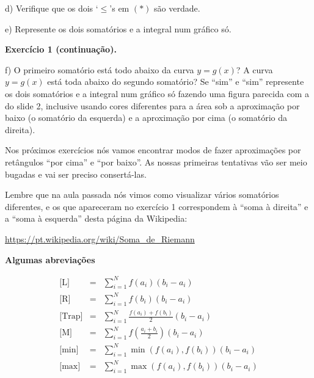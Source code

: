 \documentclass[oneside,12pt]{article}
\begin{document}
d) Verifique que os dois `$≤$'s em $(*)$ são verdade.

e) Represente os dois somatórios e a integral num gráfico só.


\newpage

{\bf Exercício 1 (continuação).}

\ssk

f) O primeiro somatório está todo abaixo da curva $y=g(x)$? A curva
$y=g(x)$ está toda abaixo do segundo somatório? Se ``sim'' e ``sim''
represente os dois somatórios e a integral num gráfico só fazendo uma
figura parecida com a do slide 2, inclusive usando cores diferentes
para a área sob a aproximação por baixo (o somatório da esquerda) e a
aproximação por cima (o somatório da direita).


\newpage

Nos próximos exercícios nós vamos encontrar modos de fazer
aproximações por retângulos ``por cima'' e ``por baixo''. As nossas
primeiras tentativas vão ser meio bugadas e vai ser preciso
consertá-las.

Lembre que na aula passada nós vimos como visualizar vários somatórios
diferentes, e os que apareceram no exercício 1 correspondem à ``soma à
direita'' e a ``soma à esquerda'' desta página da Wikipedia:

\ssk

\url{https://pt.wikipedia.org/wiki/Soma_de_Riemann}

\newpage


{\bf Algumas abreviações}

\def\sumiN#1{\sum_{i=1}^N #1 (b_i-a_i)}
\def\mname#1{\text{[#1]}}

$$\begin{array}{ccl}
  \mname{L}    &=& \sumiN {f(a_i)} \\
  \mname{R}    &=& \sumiN {f(b_i)} \\
  \mname{Trap} &=& \sumiN {\frac{f(a_i) + f(b_i)}{2}} \\
  \mname{M}    &=& \sumiN {f(\frac{a_i+b_i}{2})} \\
  \mname{min}  &=& \sumiN {\min(f(a_i), f(b_i))} \\
  \mname{max}  &=& \sumiN {\max(f(a_i), f(b_i))} \\
\end{array}
$$
\end{document}
